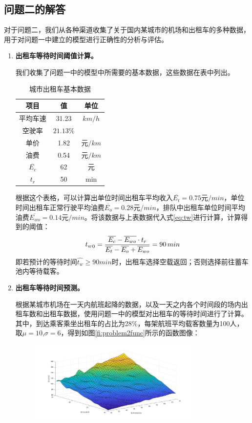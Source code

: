 \documentclass{cumcm}
\begin{document}
\subsection{问题二的解答}
对于问题二，我们从各种渠道收集了关于国内某城市的机场和出租车的多种数据，用于对问题一中建立的模型进行正确性的分析与评估。\par
\begin{enumerate}[(1)]
	\item \textbf{出租车等待时间阈值计算。}\par
	我们收集了问题一中的模型中所需要的基本数据，这些数据在表中列出。
	\begin{table}[H]
		\centering
		\caption{城市出租车基本数据\cite{taxidata,taxireport}} 
		\label{table-symbol}
		\begin{tabular*}{0.31\textwidth}{ccc}
			\toprule
			项目 & 值 & 单位 \\
			\midrule
			平均车速 & 31.23 & $km/h$ \\
			空驶率 & $21.13\%$ & \\
			单价 & 1.82 & 元$/km$ \\
			油费 & 0.54 & 元$/km$ \\
			$\overline{E_c}$ & 62 & 元 \\
			$t_r$ & 50 & min \\
			\bottomrule
		\end{tabular*}
	\end{table}
	根据这个表格，可以计算出单位时间出租车平均收入$\overline{E_t}=0.75\mbox{元}/min$，单位时间出租车正常行驶平均油费$\overline{E_o}=0.28\mbox{元}/min$，排队中出租车单位时间平均油费$\overline{E_{wo}}=0.14\mbox{元}/min$。将该数据与上表数据代入式\ref{eq:tw}进行计算，计算得到的阈值：
	\begin{equation}
		\mbox{$t_w$}_0=\frac{\overline{E_c}-\overline{E_{wo}}\cdot t_r}{\overline{E_t}-\overline{E_o}+\overline{E_{wo}}}=90\,min
	\end{equation}
	即若预计的等待时间$\hat{t_w}\ge90min$时，出租车选择空载返回；否则选择前往蓄车池内等待载客。
	\item \textbf{出租车等待时间预测。}\par
	根据某城市机场在一天内航班起降的数据，以及一天之内各个时间段的场内出租车数和出租车数据，使用问题一中的模型对出租车的等待时间进行了计算。其中，到达乘客乘坐出租车的占比为28\%，每架航班平均载客数量为100人\cite{taxidata,flightdata}，取$\mu=10$,$\sigma=6$，得到如图\ref{fi:problem2func}所示的函数图像：
	\begin{figure}[H]
		\centering
		\includegraphics[width=0.8\textwidth]{img/problem2_func.jpg}

\end{figure}
\end{enumerate}
\end{document}
